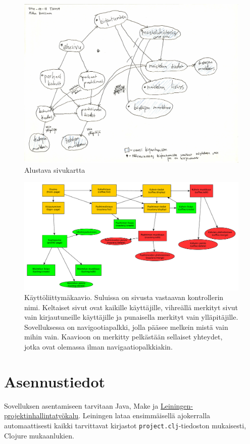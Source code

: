 \documentclass[a4paper,titlepage]{article}
\begin{document}
\begin{figure}[ht]
  \includegraphics[width=12cm]{ui/sitemap}
  \caption{Alustava sivukartta}
  \label{fig:sivukartta}
\end{figure}

\begin{figure}[t]
  \includegraphics[width=12cm]{ui}
  \caption{Käyttöliittymäkaavio. Suluissa on sivusta vastaavan
    kontrollerin nimi. Keltaiset sivut ovat kaikille käyttäjille,
    vihreällä merkityt sivut vain kirjautuneille käyttäjille ja
    punaisella merkityt vain ylläpitäjille. Sovelluksessa on
    navigootiapalkki, jolla pääsee melkein mistä vain mihin
    vain. Kaavioon on merkitty pelkästään sellaiset yhteydet, jotka
    ovat olemassa ilman navigaatiopalkkiakin.}
  \label{fig:kayttoliittyma}
\end{figure}

\section{Asennustiedot}

Sovelluksen asentamiseen tarvitaan Java, Make ja
\href{http://leiningen.org/}{Leiningen-projektinhallintatyökalu}. Leiningen
lataa ensimmäisellä ajokerralla automaattisesti kaikki tarvittavat
kirjastot \texttt{project.clj}-tiedoston mukaisesti, Clojure
mukaanlukien.
\end{document}

